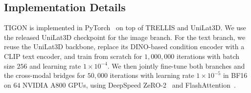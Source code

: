 \subsection{Implementation Details}
TIGON is implemented in PyTorch~\cite{pytorch} on top of TRELLIS and UniLat3D. 
We use the released UniLat3D checkpoint for the image branch. 
For the text branch, we reuse the UniLat3D backbone, replace its DINO-based condition encoder with a CLIP text encoder, and train from scratch for $1{,}000{,}000$ iterations with batch size $256$ and learning rate $1\times10^{-4}$.
We then jointly fine-tune both branches and the cross-modal bridges for $50{,}000$ iterations with learning rate $1\times10^{-5}$ in BF16 on $64$ NVIDIA A800 GPUs, using DeepSpeed ZeRO-2~\cite{deepspeed} and FlashAttention~\cite{flashattention}. 



